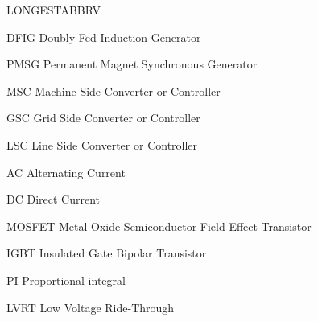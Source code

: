 \begin{theglossary}{LONGESTABBRV}
\item[DFIG] Doubly Fed Induction Generator
\item[PMSG] Permanent Magnet Synchronous Generator
\item[MSC] Machine Side Converter or Controller
\item[GSC] Grid Side Converter or Controller
\item[LSC] Line Side Converter or Controller
\item[AC] Alternating Current
\item[DC] Direct Current
\item[MOSFET] Metal Oxide Semiconductor Field Effect Transistor
\item[IGBT] Insulated Gate Bipolar Transistor
\item[PI] Proportional-integral
\item[LVRT] Low Voltage Ride-Through

\end{theglossary}
